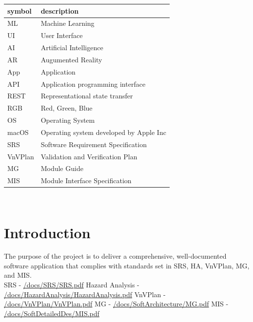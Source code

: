 \documentclass[12pt, titlepage]{article}
\begin{document}
\renewcommand{\arraystretch}{1.2}
\begin{tabular}{l l} 
  \toprule		
  \textbf{symbol} & \textbf{description}\\
  \midrule 
  ML & Machine Learning \\
  UI & User Interface\\
  AI & Artificial Intelligence \\
  AR & Augumented Reality \\
  App & Application \\
  API & Application programming interface\\
  REST & Representational state transfer\\
  RGB & Red, Green, Blue \\
  OS & Operating System \\
  macOS & Operating system developed by Apple Inc \\
  SRS & Software Requirement Specification \\
  VnVPlan & Validation and Verification Plan \\
  MG & Module Guide \\
  MIS & Module Interface Specification \\
  \bottomrule
\end{tabular}\\

\newpage

\tableofcontents

\newpage

\listoftables

\listoffigures

\newpage


\section{Introduction}
The purpose of the project is to deliver a comprehensive, well-documented software application that complies with standards set in SRS, HA, VnVPlan, MG, and MIS.
\\
\newline
SRS - \href{https://github.com/marlon4dashen/Hairesthetics/blob/main/docs/SRS/SRS.pdf}{/docs/SRS/SRS.pdf}
\newline
Hazard Analysis - \href{https://github.com/marlon4dashen/Hairesthetics/blob/main/docs/HazardAnalysis/HazardAnalysis.pdf}{/docs/HazardAnalysis/HazardAnalysis.pdf}
\newline
VnVPlan - \href{https://github.com/marlon4dashen/Hairesthetics/blob/main/docs/VnVPlan/VnVPlan.pdf}{/docs/VnVPlan/VnVPlan.pdf}
\newline
MG - \href{https://github.com/marlon4dashen/Hairesthetics/blob/main/docs/Design/SoftArchitecture/MG.pdf}{/docs/SoftArchitecture/MG.pdf}
\newline
MIS - \href{https://github.com/marlon4dashen/Hairesthetics/blob/main/docs/Design/SoftDetailedDes/MIS.pdf}{/docs/SoftDetailedDes/MIS.pdf}
\end{document}
